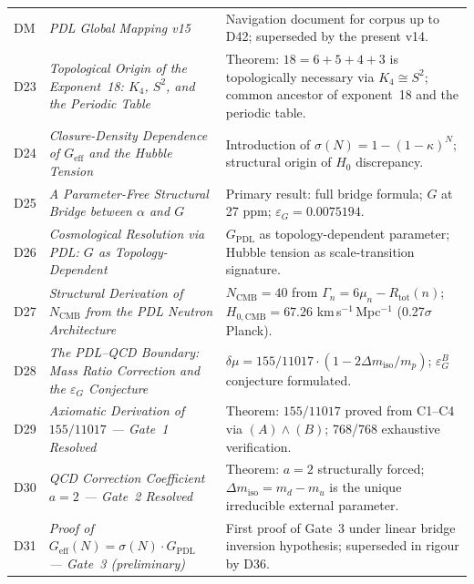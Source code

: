 \documentclass[11pt,a4paper]{article}
\theoremstyle{plain}
\theoremstyle{definition}
\theoremstyle{remark}
\newcommand{\Kfour}{K_4}
\newcommand{\Geff}{G_{\mathrm{eff}}}
\newcommand{\GPDL}{G_{\mathrm{PDL}}}
\newcommand{\epsG}{\varepsilon_G}
\newcommand{\Rtot}{R_{\mathrm{tot}}}
\newcommand{\sigmaN}{\sigma(N)}
\begin{document}
\begin{longtable}{@{}L{1.3cm}L{3.8cm}L{8.0cm}@{}}
DM & \textit{PDL Global Mapping v15}~\citep{D_Map_v10} & Navigation document for corpus up to D42; superseded by the present v14. \\[0.3em]

D23 & \textit{Topological Origin of the Exponent~18: $\Kfour$, $S^2$, and the Periodic Table}~\citep{D23} & \textcolor{proofblue}{Theorem}: $18=6+5+4+3$ is topologically necessary via $\Kfour\cong S^2$; common ancestor of exponent~18 and the periodic table. \\[0.3em]

D24 & \textit{Closure-Density Dependence of $\Geff$ and the Hubble Tension}~\citep{D24} & Introduction of $\sigmaN=1-(1-\kappa)^N$; structural origin of $H_0$ discrepancy. \\[0.3em]

D25 & \textit{A Parameter-Free Structural Bridge between $\alpha$ and $G$}~\citep{D25} & \textcolor{proofblue}{Primary result}: full bridge formula; $G$ at 27 ppm; $\epsG=0.0075194$. \\[0.3em]

D26 & \textit{Cosmological Resolution via PDL: $G$ as Topology-Dependent}~\citep{D26} & $\GPDL$ as topology-dependent parameter; Hubble tension as scale-transition signature. \\[0.3em]

D27 & \textit{Structural Derivation of $N_{\mathrm{CMB}}$ from the PDL Neutron Architecture}~\citep{D27} & $N_{\mathrm{CMB}}=40$ from $\Gamma_n=6\mu_n-\Rtot(n)$; $H_{0,\mathrm{CMB}}=67.26$ km\,s$^{-1}$\,Mpc$^{-1}$ (0.27$\sigma$ Planck). \\[0.3em]

D28 & \textit{The PDL--QCD Boundary: Mass Ratio Correction and the $\epsG$ Conjecture}~\citep{D28} & $\delta\mu=155/11017\cdot(1-2\Delta m_{\mathrm{iso}}/m_p)$; $\epsG^B$ conjecture formulated. \\[0.3em]

D29 & \textit{Axiomatic Derivation of $155/11017$ — Gate~1 Resolved}~\citep{D29} & \textcolor{proofblue}{Theorem}: $155/11017$ proved from C1--C4 via $(A)\wedge(B)$; 768/768 exhaustive verification. \\[0.3em]

D30 & \textit{QCD Correction Coefficient $a=2$ — Gate~2 Resolved}~\citep{D30} & \textcolor{proofblue}{Theorem}: $a=2$ structurally forced; $\Delta m_{\mathrm{iso}}=m_d-m_u$ is the unique irreducible external parameter. \\[0.3em]

D31 & \textit{Proof of $\Geff(N)=\sigmaN\cdot\GPDL$ — Gate~3 (preliminary)}~\citep{D31} & First proof of Gate~3 under linear bridge inversion hypothesis; superseded in rigour by D36. \\[0.3em]


\end{longtable}
\end{document}
